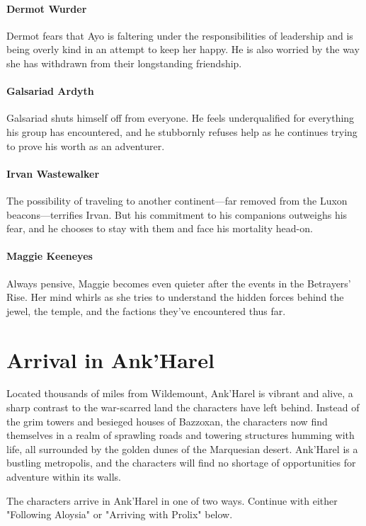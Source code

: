 \documentclass[10pt,a4paper,twoside,bg=print,twocolumn,openany,nodeprecatedcode]{dndbook}
\begin{document}
\paragraph{Dermot Wurder}
Dermot fears that Ayo is faltering under the responsibilities of leadership and is being overly kind in an attempt to keep her happy. He is also worried by the way she has withdrawn from their longstanding friendship.

\paragraph{Galsariad Ardyth}
Galsariad shuts himself off from everyone. He feels underqualified for everything his group has encountered, and he stubbornly refuses help as he continues trying to prove his worth as an adventurer.

\paragraph{Irvan Wastewalker}
The possibility of traveling to another continent—far removed from the Luxon beacons—terrifies Irvan. But his commitment to his companions outweighs his fear, and he chooses to stay with them and face his mortality head-on.

\paragraph{Maggie Keeneyes}
Always pensive, Maggie becomes even quieter after the events in the Betrayers' Rise. Her mind whirls as she tries to understand the hidden forces behind the jewel, the temple, and the factions they've encountered thus far.

\section{Arrival in Ank'Harel}
Located thousands of miles from Wildemount, Ank'Harel is vibrant and alive, a sharp contrast to the war-scarred land the characters have left behind. Instead of the grim towers and besieged houses of Bazzoxan, the characters now find themselves in a realm of sprawling roads and towering structures humming with life, all surrounded by the golden dunes of the Marquesian desert. Ank'Harel is a bustling metropolis, and the characters will find no shortage of opportunities for adventure within its walls.

The characters arrive in Ank'Harel in one of two ways. Continue with either "Following Aloysia" or "Arriving with Prolix" below.
\end{document}
